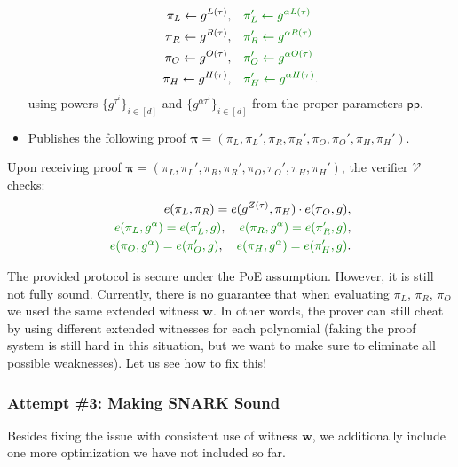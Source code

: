\documentclass[../lecture-notes.tex]{subfiles}
\begin{document}
\begin{tcolorbox}
\begin{itemize}[label=, left=0mm]
\begin{align*}
            \pi_L \gets g^{L(\tau)}, & \quad\textcolor{green!50!black}{\pi_L' \gets g^{\alpha L(\tau)}} \\
            \pi_R \gets g^{R(\tau)}, & \quad\textcolor{green!50!black}{\pi_R' \gets g^{\alpha R(\tau)}} \\
            \pi_O \gets g^{O(\tau)}, & \quad\textcolor{green!50!black}{\pi_O' \gets g^{\alpha O(\tau)}} \\
            \pi_H \gets g^{H(\tau)}, & \quad\textcolor{green!50!black}{\pi_H' \gets g^{\alpha H(\tau)}}.
        \end{align*}
        using powers $\{g^{\tau^i}\}_{i \in [d]}$ and $\{g^{\alpha\tau^i}\}_{i \in [d]}$ from the proper parameters $\mathsf{pp}$.
        \item Publishes the following proof $\boldsymbol{\pi} = (\pi_L,\pi_L',\pi_R,\pi_R',\pi_O,\pi_O',\pi_H,\pi_H')$.
    \end{itemize}
    Upon receiving proof $\boldsymbol{\pi} = (\pi_L,\pi_L',\pi_R,\pi_R',\pi_O,\pi_O',\pi_H,\pi_H')$, the verifier $\mathcal{V}$ checks:
    \begin{align*}
        e(\pi_L, \pi_R) = e(g^{Z(\tau)}, \pi_H) \cdot e(\pi_O, g), \\
        \textcolor{green!50!black}{e(\pi_L, g^{\alpha}) = e(\pi_L', g)}, \quad \textcolor{green!50!black}{e(\pi_R, g^{\alpha}) = e(\pi_R', g)}, \\
        \textcolor{green!50!black}{e(\pi_O, g^{\alpha}) = e(\pi_O', g)}, \quad \textcolor{green!50!black}{e(\pi_H, g^{\alpha}) = e(\pi_H', g)}.
    \end{align*}
\end{tcolorbox}

The provided protocol is secure under the PoE assumption. However, it is still not fully sound. Currently, there is no guarantee that when evaluating $\pi_L$, $\pi_R$, $\pi_O$ we used the same extended witness $\mathbf{w}$. In other words, the prover can still cheat by using different extended witnesses for each polynomial (faking the proof system is still hard in this situation, but we want to make sure to eliminate all possible weaknesses). Let us see how to fix this!

\subsubsection*{Attempt \#3: Making SNARK Sound}

Besides fixing the issue with consistent use of witness $\mathbf{w}$, we additionally include one more optimization we have not included so far.
\end{document}
